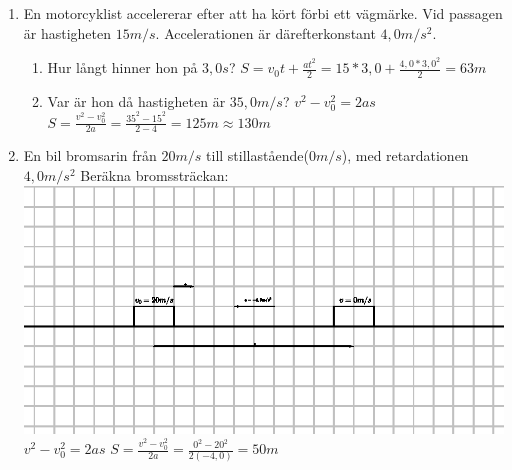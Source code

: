 \documentclass[a4paper,11pt]{article}
\begin{document}
\begin{flushleft}
\begin{enumerate}
  \item En motorcyklist accelererar efter att ha kört förbi ett vägmärke. Vid passagen är hastigheten $15m/s$.\newline
  Accelerationen är därefterkonstant $4,0m/s^2$.\newline
  \begin{enumerate}
    \item Hur långt hinner hon på $3,0s$?\newline
    $ S = v_0t+\frac{at^2}{2} = 15*3,0+\frac{4,0*3,0^2}{2} = 63m $
    \item Var är hon då hastigheten är $35,0m/s$?\newline
    $ v^2-v_0^2 = 2as $\newline
    $ S = \frac{v^2-v_0^2}{2a} = \frac{35^2-15^2}{2-4} = 125m \approx 130m $
  \end{enumerate}
  \item En bil bromsarin från $20m/s$ till stillastående($0m/s$), med retardationen $4,0m/s^2$\newline
  Beräkna bromssträckan:\newline
  \includegraphics{broms.eps}\newline
  $ v^2-v_0^2 = 2as $\newline
  $ S = \frac{v^2-v_0^2}{2a} = \frac{0^2-20^2}{2(-4,0)} = 50m $
\end{enumerate}
\end{flushleft}
\end{document}
